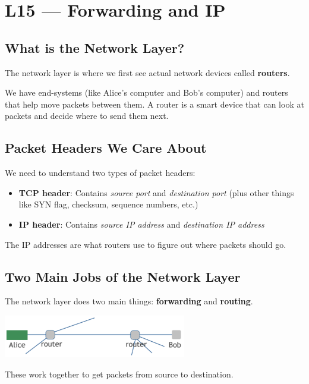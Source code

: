 \documentclass[../../compsys.tex]{subfiles}
\begin{document}
\raggedbottom
\chapter{L15 — Forwarding and IP}
\vfill
\raggedbottom

\section{What is the Network Layer?}
The network layer is where we first see actual network devices called \textbf{routers}.

We have end-systems (like Alice's computer and Bob's computer) and routers that help move packets between them. A router is a smart device that can look at packets and decide where to send them next.

\section{Packet Headers We Care About}
We need to understand two types of packet headers:

\begin{itemize}
    \item \textbf{TCP header}: Contains \textit{source port} and \textit{destination port} (plus other things like SYN flag, checksum, sequence numbers, etc.)
    \item \textbf{IP header}: Contains \textit{source IP address} and \textit{destination IP address}
\end{itemize}

The IP addresses are what routers use to figure out where packets should go.

\section{Two Main Jobs of the Network Layer}
The network layer does two main things: \textbf{forwarding} and \textbf{routing}.

\begin{center}
    \includegraphics[width=0.6\textwidth]{images/router.png}
\end{center}

These work together to get packets from source to destination.
\end{document}
